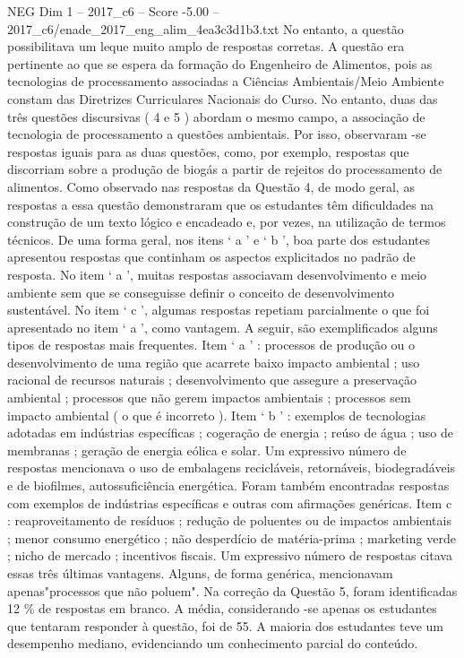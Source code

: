 \begin{textsample}{NEG Dim 1 – 2017\_c6 – Score -5.00 – 2017\_c6/enade\_2017\_eng\_alim\_4ea3c3d1b3.txt}
No entanto, a questão possibilitava um leque muito amplo de respostas corretas.
A questão era pertinente ao que se espera da formação do Engenheiro de Alimentos, pois as tecnologias de processamento associadas a Ciências Ambientais/Meio Ambiente constam das Diretrizes Curriculares Nacionais do Curso.
No entanto, duas das três questões discursivas ( 4 e 5 ) abordam o mesmo campo, a associação de tecnologia de processamento a questões ambientais.
Por isso, observaram -se respostas iguais para as duas questões, como, por exemplo, respostas que discorriam sobre a produção de biogás a partir de rejeitos do processamento de alimentos.
Como observado nas respostas da Questão 4, de modo geral, as respostas a essa questão demonstraram que os estudantes têm dificuldades na construção de um texto lógico e encadeado e, por vezes, na utilização de termos técnicos.
De uma forma geral, nos itens ‘ a ’ e ‘ b ’, boa parte dos estudantes apresentou respostas que continham os aspectos explicitados no padrão de resposta.
No item ‘ a ’, muitas respostas associavam desenvolvimento e meio ambiente sem que se conseguisse definir o conceito de desenvolvimento sustentável.
No item ‘ c ’, algumas respostas repetiam parcialmente o que foi apresentado no item ‘ a ’, como vantagem.
A seguir, são exemplificados alguns tipos de respostas mais frequentes.
Item ‘ a ’ : processos de produção ou o desenvolvimento de uma região que acarrete baixo impacto ambiental ; uso racional de recursos naturais ; desenvolvimento que assegure a preservação ambiental ; processos que não gerem impactos ambientais ; processos sem impacto ambiental ( o que é incorreto ).
Item ‘ b ’ : exemplos de tecnologias adotadas em indústrias específicas ; cogeração de energia ; reúso de água ; uso de membranas ; geração de energia eólica e solar.
Um expressivo número de respostas mencionava o uso de embalagens recicláveis, retornáveis, biodegradáveis e de biofilmes, autossuficiência energética.
Foram também encontradas respostas com exemplos de indústrias específicas e outras com afirmações genéricas.
Item c : reaproveitamento de resíduos ; redução de poluentes ou de impactos ambientais ; menor consumo energético ; não desperdício de matéria-prima ; marketing verde ; nicho de mercado ; incentivos fiscais.
Um expressivo número de respostas citava essas três últimas vantagens.
Alguns, de forma genérica, mencionavam apenas"processos que não poluem".
Na correção da Questão 5, foram identificadas 12 \% de respostas em branco.
A média, considerando -se apenas os estudantes que tentaram responder à questão, foi de 55.
A maioria dos estudantes teve um desempenho mediano, evidenciando um conhecimento parcial do conteúdo.

\end{textsample}
